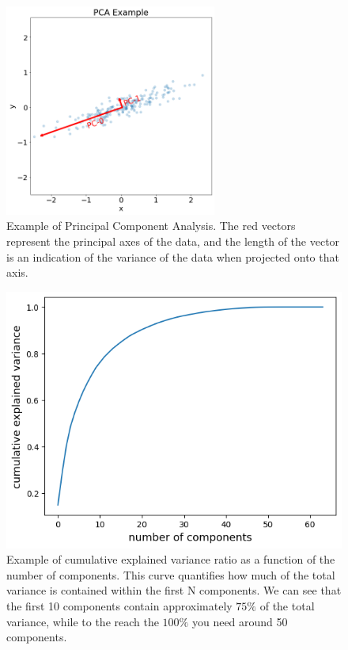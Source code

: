\documentclass{standalone}
\begin{document}
\begin{figure}[ht]

    \centering
    \includegraphics[width=0.62\textwidth]{../images/PCAexample1.png}
    
    \caption{Example of Principal Component Analysis.
     The red vectors represent the principal axes of the data, and the length of the vector is an indication of the variance of the data when projected onto that axis.}
    \label{PCAexample}
    
    \end{figure}


\begin{figure}[htp]

    \centering
    \includegraphics[width=.68\textwidth]{../images/cumulative3.png}
    
    \caption{Example of cumulative explained variance ratio as a function of the number of components. This curve quantifies how much of the total variance is contained within the first N components. We can see that the first 10 components contain approximately $75 \%$ of the total variance, while to the reach the $100 \%$ you need around 50 components.}
    \label{cumulativevr}
    
    \end{figure}
\end{document}
